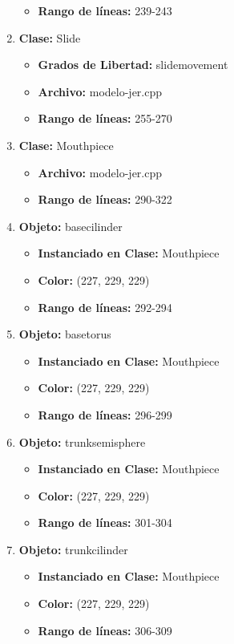 \documentclass[10pt, a4paper]{article}
\begin{document}
\begin{enumerate}
\begin{itemize}
		\item \textbf{Rango de líneas:} 239-243
	\end{itemize}
	\item \textbf{Clase:} Slide
	\begin{itemize}
		\item \textbf{Grados de Libertad:} slidemovement
		\item \textbf{Archivo:} modelo-jer.cpp
		\item \textbf{Rango de líneas:} 255-270
	\end{itemize}
	\item \textbf{Clase:} Mouthpiece
	\begin{itemize}
		\item \textbf{Archivo:} modelo-jer.cpp
		\item \textbf{Rango de líneas:} 290-322
	\end{itemize}
	\item \textbf{Objeto:} basecilinder 
	\begin{itemize}
		\item \textbf{Instanciado en Clase:} Mouthpiece
		\item \textbf{Color:} (227, 229, 229)
		\item \textbf{Rango de líneas:} 292-294
	\end{itemize}
	\item \textbf{Objeto:} basetorus
	\begin{itemize}
		\item \textbf{Instanciado en Clase:} Mouthpiece
		\item \textbf{Color:} (227, 229, 229)
		\item \textbf{Rango de líneas:} 296-299
	\end{itemize}
	\item \textbf{Objeto:} trunksemisphere
	\begin{itemize}
		\item \textbf{Instanciado en Clase:} Mouthpiece
		\item \textbf{Color:} (227, 229, 229)
		\item \textbf{Rango de líneas:} 301-304
	\end{itemize}
	\item \textbf{Objeto:} trunkcilinder 
	\begin{itemize}
		\item \textbf{Instanciado en Clase:} Mouthpiece
		\item \textbf{Color:} (227, 229, 229)
		\item \textbf{Rango de líneas:} 306-309

\end{itemize}
\end{enumerate}
\end{document}
